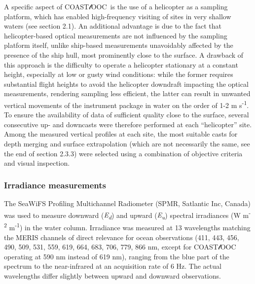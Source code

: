 \documentclass[essd, manuscript]{copernicus}
\newcommand{\coastlooc}{COAST$\mathscr{l}$OOC~\allowbreak}
\begin{document}
A specific aspect of \coastlooc is the use of a helicopter as a sampling platform, which has enabled high-frequency visiting of sites in very shallow waters (see section 2.1). An additional advantage is due to the fact that helicopter-based optical measurements are not influenced by the sampling platform itself, unlike ship-based measurements unavoidably affected by the presence of the ship hull, most prominently close to the surface. A drawback of this approach is the difficulty to operate a helicopter stationary at a constant height, especially at low or gusty wind conditions: while the former requires substantial flight heights to avoid the helicopter downdraft impacting the optical measurements, rendering sampling less efficient, the latter can result in unwanted vertical movements of the instrument package in water on the order of 1-2 m s\textsuperscript{-1}. To ensure the availability of data of sufficient quality close to the surface, several consecutive up- and downcasts were therefore performed at each “helicopter” site. Among the measured vertical profiles at each site, the most suitable casts for depth merging and surface extrapolation (which are not necessarily the same, see the end of section 2.3.3) were selected using a combination of objective criteria and visual inspection.

\subsubsection{Irradiance measurements}

The SeaWiFS Profiling Multichannel Radiometer (SPMR, Satlantic Inc, Canada) was used to measure downward (\textit{E\textsubscript{d}}) and upward (\textit{E\textsubscript{u}}) spectral irradiances (W m\textsuperscript{-2} \textmu m\textsuperscript{-1}) in the water column. Irradiance was measured at 13 wavelengths matching the MERIS channels of direct relevance for ocean observations (411, 443, 456, 490, 509, 531, 559, 619, 664, 683, 706, 779, 866 nm, except for \coastlooc 1 operating at 590 nm instead of 619 nm), ranging from the blue part of the spectrum to the near-infrared at an acquisition rate of 6 Hz. The actual wavelengths differ slightly between upward and downward observations.
\end{document}
